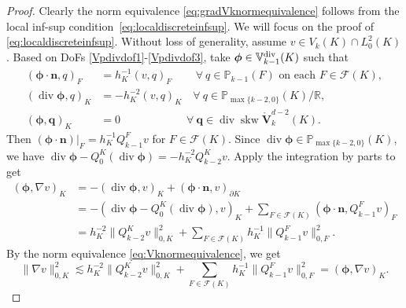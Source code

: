 \documentclass[10pt]{amsart}
\newcommand{\bs}{\boldsymbol}
\renewcommand{\div}{\operatorname{div}}
\newcommand{\skw}{\operatorname{skw}}
\numberwithin{equation}{section}
\begin{document}
\begin{proof}
Clearly the norm equivalence \eqref{eq:gradVknormequivalence} follows from the local inf-sup condition~\eqref{eq:localdiscreteinfsup}. We will focus on the proof of \eqref{eq:localdiscreteinfsup}.
Without loss of generality, assume $v\in V_k(K)\cap L_0^2(K)$.
Based on DoFs \eqref{Vpdivdof1}-\eqref{Vpdivdof3}, take $\boldsymbol{\phi}\in\mathbb{V}_{k-1}^{\rm div}(K)$ such that
\begin{align*}
(\boldsymbol{\phi}\cdot\boldsymbol{n}, q)_F&=h_K^{-1}(v, q)_F  \quad\quad\,\forall~q\in\mathbb P_{k-1}(F) \textrm{ on each }  F\in\mathcal F(K), \\
(\div\boldsymbol{\phi}, q)_K&=-h_K^{-2}(v, q)_K  \quad\forall~q\in\mathbb P_{\max\{k-2,0\}}(K)/\mathbb R, \\
(\boldsymbol{\phi}, \bs q)_K&=0  \qquad\qquad\qquad\forall~\bs q\in \div\skw\mathring{\boldsymbol{V}}_{k}^{d-2}(K). 
\end{align*}
Then $(\boldsymbol{\phi}\cdot\boldsymbol{n})|_{F}=h_K^{-1}Q_{k-1}^Fv$ for $F\in\mathcal F(K)$. Since $\div\boldsymbol{\phi}\in \mathbb P_{\max\{k-2,0\}}(K)$, we have $\div\boldsymbol{\phi}-Q_{0}^K(\div\boldsymbol{\phi})=-h_K^{-2}Q_{k-2}^Kv$. Apply the integration by parts to get
\begin{align*}
(\boldsymbol{\phi}, \nabla v)_K&=-(\div\boldsymbol{\phi}, v)_K + (\boldsymbol{\phi}\cdot\boldsymbol{n}, v)_{\partial K} \\
&=-(\div\boldsymbol{\phi}-Q_{0}^K(\div\boldsymbol{\phi}), v)_K+\sum_{F\in\mathcal F(K)}(\boldsymbol{\phi}\cdot\boldsymbol{n}, Q_{k-1}^Fv)_{F} \\
&=h_K^{-2}\|Q_{k-2}^Kv\|_{0,K}^2+\sum_{F\in\mathcal F(K)}h_K^{-1}\|Q_{k-1}^Fv\|_{0,F}^2.
\end{align*}
By the norm equivalence \eqref{eq:Vknormequivalence}, we get
\begin{equation}\label{eq:20220204}
\|\nabla v\|_{0,K}^{2}\lesssim h_K^{-2}\|Q_{k-2}^Kv\|_{0,K}^2+\sum_{F\in\mathcal F(K)}h_K^{-1}\|Q_{k-1}^Fv\|_{0,F}^2= (\boldsymbol{\phi}, \nabla v)_K.
\end{equation}


\end{proof}
\end{document}
